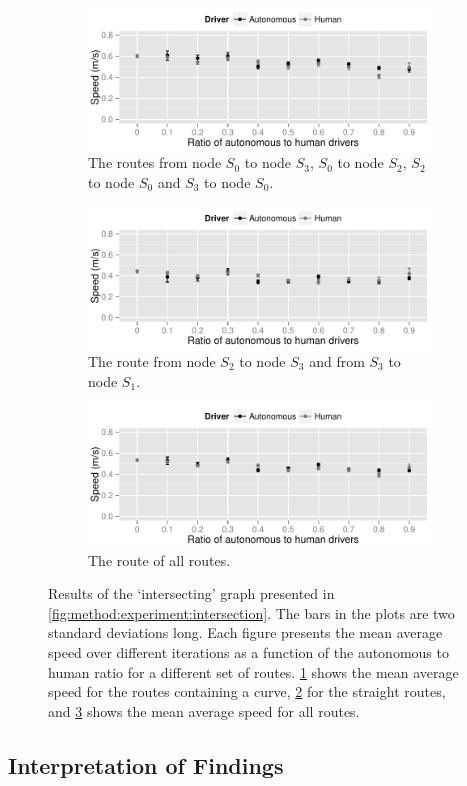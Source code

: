 \begin{figure}
	\centering
	\begin{subfigure}{\textwidth}
		\centering
		\includegraphics[width=\textwidth]{./img/results_intersecting_03_01}
		\caption{The routes from node $S_0$ to node $S_3$, $S_0$ to node $S_2$, $S_2$ to node $S_0$ and $S_3$ to node $S_0$.}
		\label{fig:results:intersecting:03}
	\end{subfigure}
	\begin{subfigure}{\textwidth}
		\centering
		\includegraphics[width=\textwidth]{./img/results_intersecting_13}
		\caption{The route from node $S_2$ to node $S_3$ and from $S_3$ to node $S_1$.}
		\label{fig:results:intersecting:13}
	\end{subfigure}	
	\begin{subfigure}{\textwidth}
		\centering
		\includegraphics[width=\textwidth]{./img/results_intersecting}
		\caption{The route of all routes.}
		\label{fig:results:intersecting:all}
	\end{subfigure}		
	\caption{Results of the `intersecting' graph presented in \cref{fig:method:experiment:intersection}. The bars in the plots are two standard deviations long. Each figure presents the mean average speed over different iterations as a function of the autonomous to human ratio for a different set of routes. \ref{fig:results:intersecting:03} shows the mean average speed for the routes containing a curve, \ref{fig:results:intersecting:13} for the straight routes, and \ref{fig:results:intersecting:all} shows the mean average speed for all routes.}
	\label{fig:results:intersecting}
\end{figure}

\subsection{Interpretation of Findings}
\label{sub:results:interpretation}

